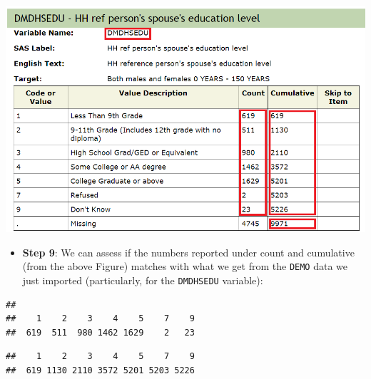 \documentclass[
]{book}
\newenvironment{Shaded}{\begin{snugshade}}{\end{snugshade}}
\newcommand{\FunctionTok}[1]{\textcolor[rgb]{0.00,0.00,0.00}{#1}}
\newcommand{\NormalTok}[1]{#1}
\newcommand{\SpecialCharTok}[1]{\textcolor[rgb]{0.00,0.00,0.00}{#1}}
\providecommand{\tightlist}{%
  \setlength{\itemsep}{0pt}\setlength{\parskip}{0pt}}
\begin{document}
\includegraphics[width=0.65\linewidth]{images/DMDHSEDU}

\begin{itemize}
\tightlist
\item
  \textbf{Step 9}: We can assess if the numbers reported under count and cumulative (from the above Figure) matches with what we get from the \texttt{DEMO} data we just imported (particularly, for the \texttt{DMDHSEDU} variable):
\end{itemize}

\begin{Shaded}
\end{Shaded}

\begin{verbatim}
## 
##    1    2    3    4    5    7    9 
##  619  511  980 1462 1629    2   23
\end{verbatim}

\begin{Shaded}
\end{Shaded}

\begin{verbatim}
##    1    2    3    4    5    7    9 
##  619 1130 2110 3572 5201 5203 5226
\end{verbatim}

\begin{Shaded}
\end{Shaded}
\end{document}
